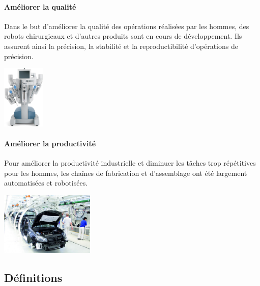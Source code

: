 \documentclass[10pt,fleqn]{article} %
\begin{document}
\paragraph*{Améliorer la qualité}
\begin{minipage}[c]{0.7\textwidth}
Dans le but d'améliorer la qualité des opérations réalisées par les hommes, des
robots chirurgicaux et d'autres produits sont en cours de développement. Ils
assurent ainsi la précision, la stabilité et la reproductibilité d'opérations
de précision.
\end{minipage}\hfill
\begin{minipage}[c]{0.2\textwidth}
 \begin{center}
 \includegraphics[height=3cm]{images/robot_chir.png}
 \end{center}
\end{minipage}

\paragraph*{Améliorer la productivité}

\begin{minipage}[c]{0.6\textwidth}
Pour améliorer la productivité industrielle et diminuer les tâches trop
répétitives pour les hommes, les chaînes de
fabrication et d'assemblage ont été largement automatisées et robotisées.
\end{minipage}\hfill
\begin{minipage}[c]{0.3\textwidth}
 \begin{center}
 \includegraphics[height=3cm]{images/chaine_prod.png}
 \end{center}
\end{minipage}

\subsection{Définitions}
\end{document}
